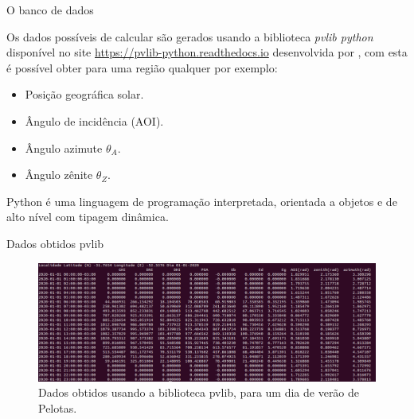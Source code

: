 \documentclass{beamer}
\begin{document}
\begin{frame}{O banco de dados}

Os dados possíveis de calcular são gerados usando a biblioteca \textit{pvlib python} disponível no site \url{https://pvlib-python.readthedocs.io} desenvolvida por \cite{pvlib}, com esta é possível obter para uma região qualquer por exemplo: 

\begin{itemize}

  \item Posição geográfica solar.
  
  \item Ângulo de incidência (AOI).

  \item Ângulo azimute $\theta_A$.
  
  \item Ângulo zênite $\theta_Z$.
  
\end{itemize}

Python é uma linguagem de programação interpretada, orientada a objetos e de alto nível com tipagem dinâmica.

\end{frame}


\begin{frame}{Dados obtidos pvlib}

\begin{figure}[H]
    \centering
    \includegraphics[width=1\textwidth]{./Figuras/pv_lib_pelotas_dados.png}
    \caption{Dados obtidos usando a biblioteca pvlib, para um dia de verão de Pelotas.}
   \label{fig:pv_lib_pelotas_dados}
\end{figure}

\end{frame}

\end{document}
